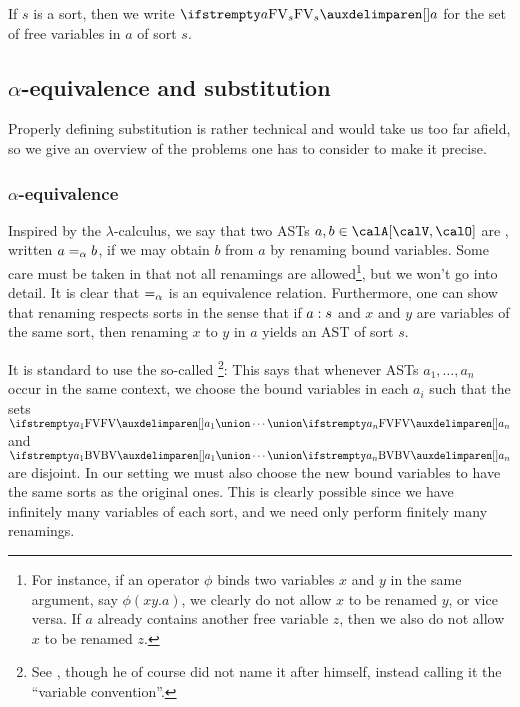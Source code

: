 If $s$ is a sort, then we write $\freevarsort{s}{a}$ for the set of free variables in $a$ of sort $s$.


\subsection{\texorpdfstring{$\alpha$}{alpha}-equivalence and substitution}

Properly defining substitution is rather technical and would take us too far afield, so we give an overview of the problems one has to consider to make it precise.


\subsubsection{\texorpdfstring{$\alpha$}{alpha}-equivalence}

Inspired by the $\lambda$-calculus, we say that two ASTs $a,b \in \setAST{\setVarAST}{\setOp}$ are , written $a =_\alpha b$, if we may obtain $b$ from $a$ by renaming bound variables. Some care must be taken in that not all renamings are allowed\footnote{For instance, if an operator $\phi$ binds two variables $x$ and $y$ in the same argument, say $\phi(xy.a)$, we clearly do not allow $x$ to be renamed $y$, or vice versa. If $a$ already contains another free variable $z$, then we also do not allow $x$ to be renamed $z$.}, but we won't go into detail. It is clear that $=_\alpha$ is an equivalence relation. Furthermore, one can show that renaming respects sorts in the sense that if $a : s$ and $x$ and $y$ are variables of the same sort, then renaming $x$ to $y$ in $a$ yields an AST of sort $s$.

It is standard to use the so-called \footnote{See \textcite[.13]{barendregt-lambda}, though he of course did not name it after himself, instead calling it the \enquote{variable convention}.}: This says that whenever ASTs $a_1, \ldots, a_n$ occur in the same context, we choose the bound variables in each $a_i$ such that the sets $\freevar{a_1} \union \cdots \union \freevar{a_n}$ and $\boundvar{a_1} \union \cdots \union \boundvar{a_n}$ are disjoint. In our setting we must also choose the new bound variables to have the same sorts as the original ones. This is clearly possible since we have infinitely many variables of each sort, and we need only perform finitely many renamings.

